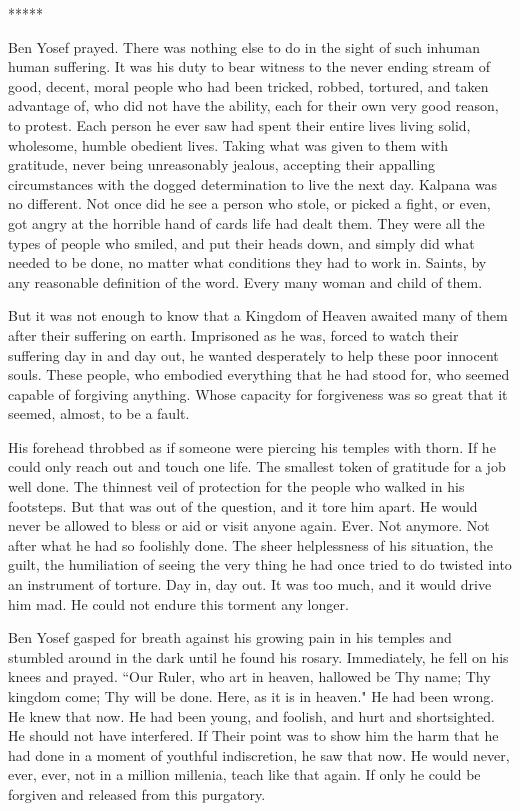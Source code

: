 \documentclass{amsart}
\begin{document}
\begin{center} ***** \end{center}

Ben Yosef prayed. There was nothing else to do in the sight of such inhuman human suffering. It was his duty to bear witness to the never ending stream of good, decent, moral people who had been tricked, robbed, tortured, and taken advantage of, who did not have the ability, each for their own very good reason, to protest. Each person he ever saw had spent their entire lives living solid, wholesome, humble obedient lives. Taking what was given to them with gratitude, never being unreasonably jealous, accepting their appalling circumstances with the dogged determination to live the next day. Kalpana was no different. Not once did he see a person who stole, or picked a fight, or even, got angry at the horrible hand of cards life had dealt them. They were all the types of people who smiled, and put their heads down, and simply did what needed to be done, no matter what conditions they had to work in. Saints, by any reasonable definition of the word. Every many woman and child of them. 

But it was not enough to know that a Kingdom of Heaven awaited many of them after their suffering on earth. Imprisoned as he was, forced to watch their suffering day in and day out, he wanted desperately to help these poor innocent souls. These people, who embodied everything that he had stood for, who seemed capable of forgiving anything. Whose capacity for forgiveness was so great that it seemed, almost, to be a fault. 

His forehead throbbed as if someone were piercing his temples with thorn. If he could only reach out and touch one life. The smallest token of gratitude for a job well done. The thinnest veil of protection for the people who walked in his footsteps. But that was out of the question, and it tore him apart. He would never be allowed to bless or aid or visit anyone again. Ever. Not anymore. Not after what he had so foolishly done. The sheer helplessness of his situation, the guilt, the humiliation of seeing the very thing he had once tried to do twisted into an instrument of torture. Day in, day out. It was too much, and it would drive him mad. He could not endure this torment any longer. 

Ben Yosef gasped for breath against his growing pain in his temples and stumbled around in the dark until he found his rosary. Immediately, he fell on his knees and prayed. ``Our Ruler, who art in heaven, hallowed be Thy name; Thy kingdom come; Thy will be done. Here, as it is in heaven." He had been wrong. He knew that now. He had been young, and foolish, and hurt and shortsighted. He should not have interfered. If Their point was to show him the harm that he had done in a moment of youthful indiscretion, he saw that now. He would never, ever, ever, not in a million millenia, teach like that again. If only he could be forgiven and released from this purgatory.
\end{document}
